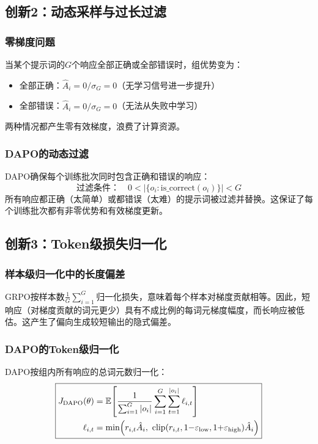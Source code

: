 \subsection{创新2：动态采样与过长过滤}

\subsubsection{零梯度问题}

当某个提示词的$G$个响应全部正确或全部错误时，组优势变为：
\begin{itemize}[leftmargin=*, itemsep=0pt]
\item 全部正确：$\hat{A}_i = 0 / \sigma_G = 0$（无学习信号进一步提升）
\item 全部错误：$\hat{A}_i = 0 / \sigma_G = 0$（无法从失败中学习）
\end{itemize}
两种情况都产生零有效梯度，浪费了计算资源。

\subsubsection{DAPO的动态过滤}

DAPO确保每个训练批次同时包含正确和错误的响应：
\begin{equation}
\text{过滤条件：} \quad 0 < |\{o_i : \text{is\_correct}(o_i)\}| < G
\label{eq:dynamic}
\end{equation}
所有响应都正确（太简单）或都错误（太难）的提示词被过滤并替换。这保证了每个训练批次都有非零优势和有效梯度更新。

\subsection{创新3：Token级损失归一化}

\subsubsection{样本级归一化中的长度偏差}

GRPO按样本数$\frac{1}{G}\sum_{i=1}^{G}$归一化损失，意味着每个样本对梯度贡献相等。因此，短响应（对梯度贡献的词元更少）具有不成比例的每词元梯度幅度，而长响应被低估。这产生了偏向生成较短输出的隐式偏差。

\subsubsection{DAPO的Token级归一化}

DAPO按组内所有响应的总词元数归一化：
\begin{equation}
\boxed{
\begin{aligned}
J_{\text{DAPO}}(\theta) &= \mathbb{E}\!\left[\frac{1}{\sum_{i=1}^{G}|o_i|}\sum_{i=1}^{G}\sum_{t=1}^{|o_i|} \ell_{i,t}\right] \\
\ell_{i,t} &= \min\!\left(r_{i,t}\hat{A}_i,\ \text{clip}(r_{i,t}, 1{-}\varepsilon_{\text{low}}, 1{+}\varepsilon_{\text{high}})\hat{A}_i\right)
\end{aligned}
}
\label{eq:dapo}
\end{equation}

